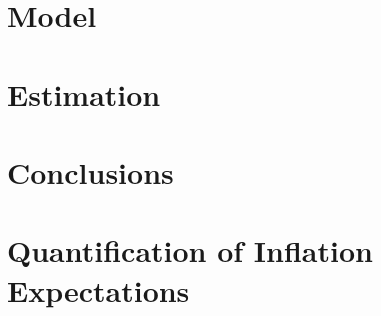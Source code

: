 \documentclass[review]{elsarticle}
\begin{document}
\section{Model}\label{sec:Model}

\section{Estimation}\label{sec:Estimation}

\section{Conclusions} \label{sec:Conclusions}




\appendix

\section{Quantification of Inflation Expectations}\label{sec:Quantification of Inflation Expectations}
\end{document}

